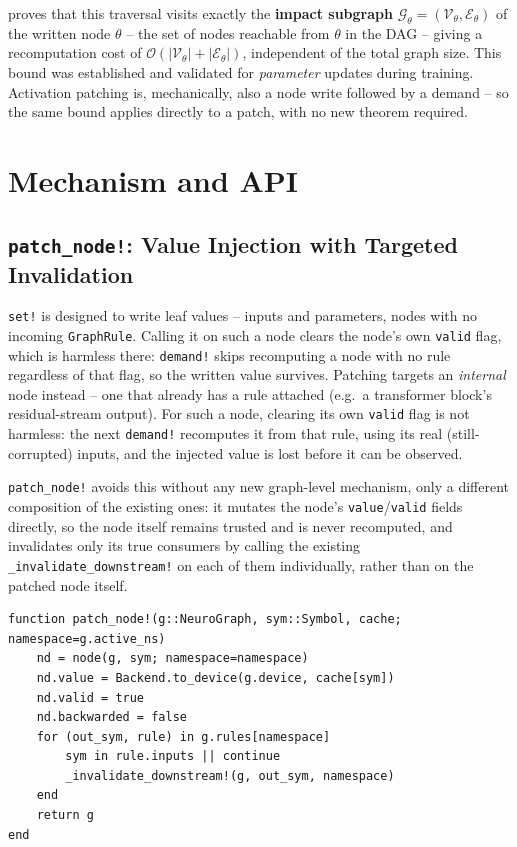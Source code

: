 \documentclass{article}
\begin{document}
\cite{neurodsl} proves that this traversal visits exactly the \textbf{impact subgraph}
$\mathcal{G}_\theta = (\mathcal{V}_\theta, \mathcal{E}_\theta)$ of the written node $\theta$ --
the set of nodes reachable from $\theta$ in the DAG -- giving a recomputation cost of
$\mathcal{O}(|\mathcal{V}_\theta| + |\mathcal{E}_\theta|)$, independent of the total graph size.
This bound was established and validated for \emph{parameter} updates during training. Activation
patching is, mechanically, also a node write followed by a demand -- so the same bound applies
directly to a patch, with no new theorem required.

\section{Mechanism and API}
\label{sec:mechanism}

\subsection{\texttt{patch\_node!}: Value Injection with Targeted Invalidation}

\texttt{set!} is designed to write leaf values -- inputs and parameters, nodes with no incoming
\texttt{GraphRule}. Calling it on such a node clears the node's own \texttt{valid} flag, which is
harmless there: \texttt{demand!} skips recomputing a node with no rule regardless of that flag,
so the written value survives. Patching targets an \emph{internal} node instead -- one that
already has a rule attached (e.g.\ a transformer block's residual-stream output). For such a
node, clearing its own \texttt{valid} flag is not harmless: the next \texttt{demand!} recomputes
it from that rule, using its real (still-corrupted) inputs, and the injected value is lost before
it can be observed.

\texttt{patch\_node!} avoids this without any new graph-level mechanism, only a different
composition of the existing ones: it mutates the node's \texttt{value}/\texttt{valid} fields
directly, so the node itself remains trusted and is never recomputed, and invalidates only its
true consumers by calling the existing \texttt{\_invalidate\_downstream!} on each of them
individually, rather than on the patched node itself.

\begin{lstlisting}[caption={\texttt{patch\_node!} (\texttt{src/patching.jl})},label={lst:patchnode}]
function patch_node!(g::NeuroGraph, sym::Symbol, cache; namespace=g.active_ns)
    nd = node(g, sym; namespace=namespace)
    nd.value = Backend.to_device(g.device, cache[sym])
    nd.valid = true
    nd.backwarded = false
    for (out_sym, rule) in g.rules[namespace]
        sym in rule.inputs || continue
        _invalidate_downstream!(g, out_sym, namespace)
    end
    return g
end
\end{lstlisting}
\end{document}
